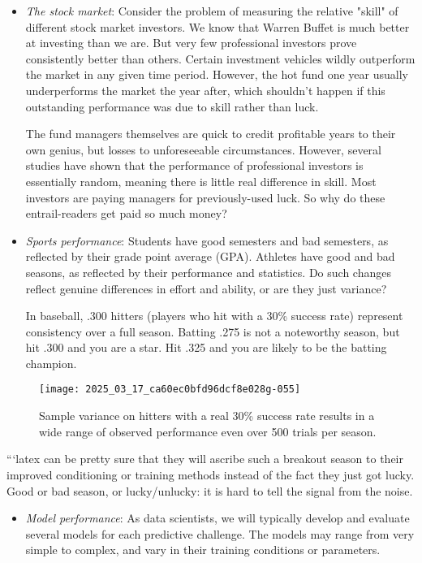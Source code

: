 \documentclass[10pt]{article}
\begin{document}
\begin{itemize}
  \item \textit{The stock market}: Consider the problem of measuring the relative "skill" of different stock market investors. We know that Warren Buffet is much better at investing than we are. But very few professional investors prove consistently better than others. Certain investment vehicles wildly outperform the market in any given time period. However, the hot fund one year usually underperforms the market the year after, which shouldn't happen if this outstanding performance was due to skill rather than luck.

The fund managers themselves are quick to credit profitable years to their own genius, but losses to unforeseeable circumstances. However, several studies have shown that the performance of professional investors is essentially random, meaning there is little real difference in skill. Most investors are paying managers for previously-used luck. So why do these entrail-readers get paid so much money?

  \item \textit{Sports performance}: Students have good semesters and bad semesters, as reflected by their grade point average (GPA). Athletes have good and bad seasons, as reflected by their performance and statistics. Do such changes reflect genuine differences in effort and ability, or are they just variance?

In baseball, .300 hitters (players who hit with a 30\% success rate) represent consistency over a full season. Batting .275 is not a noteworthy season, but hit .300 and you are a star. Hit .325 and you are likely to be the batting champion.
\end{itemize}

\begin{figure}[h!]
  \centering
  \texttt{[image: 2025\_03\_17\_ca60ec0bfd96dcf8e028g-055]}
  \caption{Sample variance on hitters with a real 30\% success rate results in a wide range of observed performance even over 500 trials per season.}
\end{figure}
```latex
can be pretty sure that they will ascribe such a breakout season to their improved conditioning or training methods instead of the fact they just got lucky. Good or bad season, or lucky/unlucky: it is hard to tell the signal from the noise.

\begin{itemize}
  \item \textit{Model performance}: As data scientists, we will typically develop and evaluate several models for each predictive challenge. The models may range from very simple to complex, and vary in their training conditions or parameters.
\end{itemize}
\end{document}
